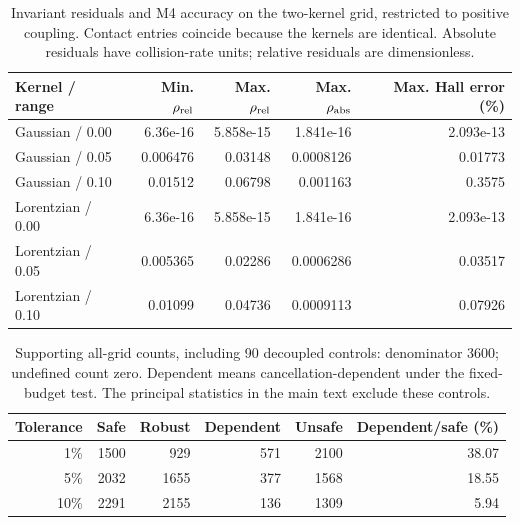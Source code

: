 \begin{table}[ht]\centering\small
\begin{tabular}{lrrrr}\toprule
Kernel / range & Min. $\rho_{\rm rel}$ & Max. $\rho_{\rm rel}$ & Max. $\rho_{\rm abs}$ & Max. Hall error (\%)\\\midrule
Gaussian / 0.00 & 6.36e-16 & 5.858e-15 & 1.841e-16 & 2.093e-13\\
Gaussian / 0.05 & 0.006476 & 0.03148 & 0.0008126 & 0.01773\\
Gaussian / 0.10 & 0.01512 & 0.06798 & 0.001163 & 0.3575\\
Lorentzian / 0.00 & 6.36e-16 & 5.858e-15 & 1.841e-16 & 2.093e-13\\
Lorentzian / 0.05 & 0.005365 & 0.02286 & 0.0006286 & 0.03517\\
Lorentzian / 0.10 & 0.01099 & 0.04736 & 0.0009113 & 0.07926\\
\bottomrule\end{tabular}
\caption{Invariant residuals and M4 accuracy on the two-kernel grid, restricted to positive coupling. Contact entries coincide because the kernels are identical. Absolute residuals have collision-rate units; relative residuals are dimensionless.}\end{table}
\begin{table}[ht]\centering\small
\begin{tabular}{rrrrrr}\toprule
Tolerance & Safe & Robust & Dependent & Unsafe & Dependent/safe (\%)\\\midrule
1\% & 1500 & 929 & 571 & 2100 & 38.07\\
5\% & 2032 & 1655 & 377 & 1568 & 18.55\\
10\% & 2291 & 2155 & 136 & 1309 & 5.94\\
\bottomrule\end{tabular}
\caption{Supporting all-grid counts, including 90 decoupled controls: denominator 3600; undefined count zero. Dependent means cancellation-dependent under the fixed-budget test. The principal statistics in the main text exclude these controls.}\end{table}
